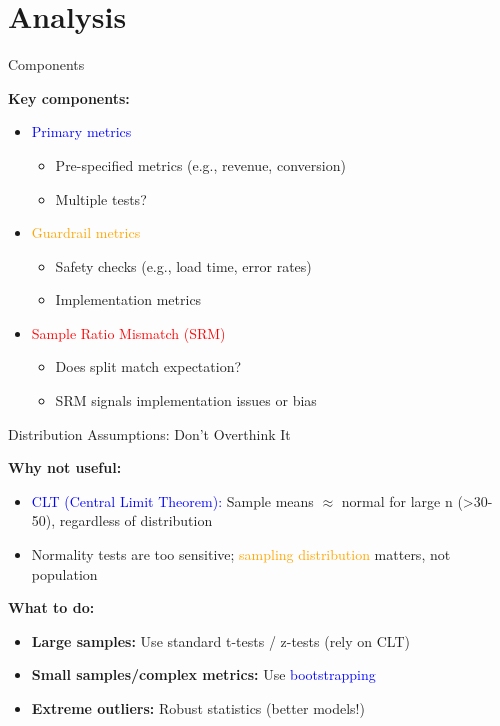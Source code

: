 \documentclass{beamer}
\newcommand{\blue}[1]{\textcolor{blue}{#1}}
\newcommand{\red}[1]{\textcolor{red}{#1}}
\newcommand{\orange}[1]{\textcolor{orange}{#1}}
\begin{document}
\section{Analysis}

\begin{frame}{Components }

\textbf{Key components:}
\begin{itemize}
    \item \blue{Primary metrics}
    \begin{itemize}
        \item Pre-specified metrics (e.g., revenue, conversion)
        \item Multiple tests?
    \end{itemize}
    \item \orange{Guardrail metrics}
    \begin{itemize}
        \item Safety checks (e.g., load time, error rates)
        \item Implementation metrics
    \end{itemize}
    \item \red{Sample Ratio Mismatch (SRM)}
    \begin{itemize}
        \item Does split match expectation?
        \item SRM signals implementation issues or bias
    \end{itemize}
\end{itemize}

\end{frame}

\begin{frame}{Distribution Assumptions: Don't Overthink It }

\textbf{Why not useful:}
\begin{itemize}
    \item \blue{CLT (Central Limit Theorem):} Sample means $\approx$ normal for large n (>30-50), regardless of distribution
    \item Normality tests are too sensitive; \orange{sampling distribution} matters, not population
\end{itemize}

\vspace{0.1cm}
\textbf{What to do:}
\begin{itemize}
    \item \textbf{Large samples:} Use standard t-tests / z-tests (rely on CLT)
    \item \textbf{Small samples/complex metrics:} Use \blue{bootstrapping}
    \item \textbf{Extreme outliers:} Robust statistics (better models!)
\end{itemize}

\end{frame}
\end{document}
